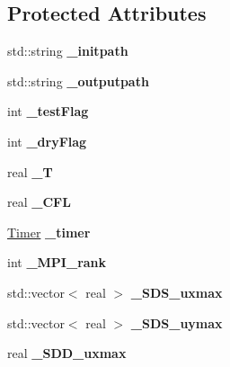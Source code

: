 \subsection*{Protected Attributes}
\begin{DoxyCompactItemize}
\item 
\mbox{\label{classEngine_ae12535c5ba837c7ea2636f76678132fe}} 
std\+::string {\bfseries \+\_\+initpath}
\item 
\mbox{\label{classEngine_adf268ff3f02e5c4a4d9e987c5eb1d925}} 
std\+::string {\bfseries \+\_\+outputpath}
\item 
\mbox{\label{classEngine_a63dbd1e0bcf5221273e991676ada9811}} 
int {\bfseries \+\_\+test\+Flag}
\item 
\mbox{\label{classEngine_a30cd2cb8cf89a468f09b28109e91104d}} 
int {\bfseries \+\_\+dry\+Flag}
\item 
\mbox{\label{classEngine_ad868f62c35249da60df7aba62151e6dd}} 
real {\bfseries \+\_\+T}
\item 
\mbox{\label{classEngine_a1c37d4f8d2f9c46afeb5356bb496bde4}} 
real {\bfseries \+\_\+\+C\+FL}
\item 
\mbox{\label{classEngine_a08555133228ffdf91eca97451f777ef2}} 
\mbox{\hyperlink{classTimer}{Timer}} {\bfseries \+\_\+timer}
\item 
\mbox{\label{classEngine_a4e9850fba1cc1df1ab81d5ea6b9f6c82}} 
int {\bfseries \+\_\+\+M\+P\+I\+\_\+rank}
\item 
\mbox{\label{classEngine_aa06c4f3111e2fe70888af5b6b9fdbdde}} 
std\+::vector$<$ real $>$ {\bfseries \+\_\+\+S\+D\+S\+\_\+uxmax}
\item 
\mbox{\label{classEngine_a25d40c496dff6801e1b8b52eadd4a893}} 
std\+::vector$<$ real $>$ {\bfseries \+\_\+\+S\+D\+S\+\_\+uymax}
\item 
\mbox{\label{classEngine_ab6c4104db16ab3201e34af695c3492c1}} 
real {\bfseries \+\_\+\+S\+D\+D\+\_\+uxmax}
\item 

\end{DoxyCompactItemize}
